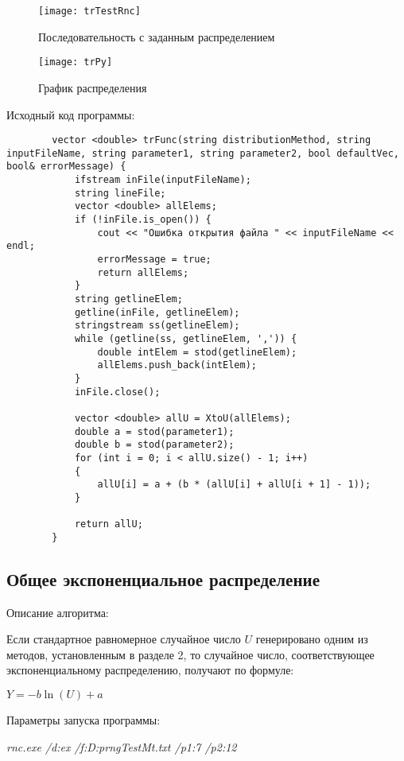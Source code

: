 \documentclass[bachelor, och, coursework]{shiza}
\begin{document}
	\begin{figure}[H]
		\centering
		\texttt{[image: trTestRnc]}
		\caption{Последовательность с заданным распределением}
		\label{fig:trTestRnc}
	\end{figure}
	
	\begin{figure}[H]
		\centering
		\texttt{[image: trPy]}
		\caption{График распределения}
		\label{fig:trPy}
	\end{figure}
	
	Исходный код программы:
	
	\begin{verbatim}
		vector <double> trFunc(string distributionMethod, string inputFileName, string parameter1, string parameter2, bool defaultVec, bool& errorMessage) {
			ifstream inFile(inputFileName);
			string lineFile;
			vector <double> allElems;
			if (!inFile.is_open()) {
				cout << "Ошибка открытия файла " << inputFileName << endl;
				errorMessage = true;
				return allElems;
			}
			string getlineElem;
			getline(inFile, getlineElem);
			stringstream ss(getlineElem);
			while (getline(ss, getlineElem, ',')) {
				double intElem = stod(getlineElem);
				allElems.push_back(intElem);
			}
			inFile.close();
			
			vector <double> allU = XtoU(allElems);
			double a = stod(parameter1);
			double b = stod(parameter2);
			for (int i = 0; i < allU.size() - 1; i++)
			{
				allU[i] = a + (b * (allU[i] + allU[i + 1] - 1));
			}
			
			return allU;
		}
	\end{verbatim}
	

	\subsection{Общее экспоненциальное распределение}
	
	Описание алгоритма:
	
	Если стандартное равномерное случайное число $U$ генерировано одним из методов, установленным в разделе 2, то случайное число, соответствующее экспоненциальному распределению, получают по формуле:
	
	\begin{center}
		$Y = -b \ln(U) + a$
	\end{center}
	
	Параметры запуска программы:
	
	\textit{rnc.exe /d:ex /f:D:prngTestMt.txt /p1:7 /p2:12}
	
\end{document}
